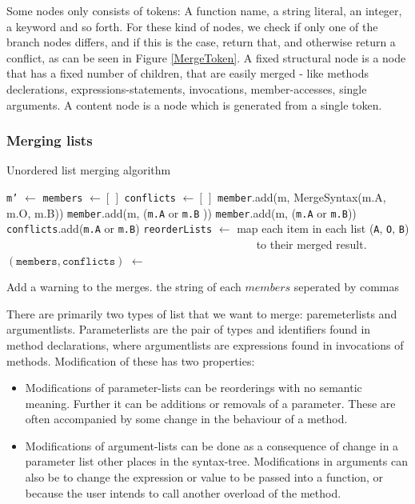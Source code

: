 \documentclass[11pt]{article}
\begin{document}
Some nodes only consists of tokens: A function name, a string literal, an integer, a keyword and so forth. For these kind of nodes, we check if only one of the branch nodes differs, and if this is the case, return that, and otherwise return a conflict, as can be seen in Figure \ref{MergeToken}. A fixed structural node is a node that has a fixed number of children, that are easily merged - like methods declerations, expressions-statements, invocations, member-accesses, single arguments. A content node is a node which is generated from a single token.

\subsubsection{Merging lists}
\begin{algorithm}
  \caption{Unordered list merging algorithm}
  \label{Listmerger}
\begin{algorithmic}
    \State \texttt{m'} $\gets$ 
    \State \texttt{members} $\gets [\,]$
   	\State \texttt{conflicts} $\gets [\,]$
           \State \texttt{member}.add(m, MergeSyntax(m.A, m.O, m.B))
			\State \texttt{member}.add(m, (\texttt{m.A} or \texttt{m.B} ))
			\State \texttt{member}.add(m, (\texttt{m.A} or \texttt{m.B}))
			\State \texttt{conflicts}.add(\texttt{m.A} or \texttt{m.B})
		\EndIf
	\EndFor
	\State \texttt{reorderLists} $\gets$ map each item in each list (\texttt{A}, \texttt{O}, \texttt{B})
	\State ~~~~~~~~~~~~~~~~~~~~~~~~~~~~~~~~~~~~~~~~~~~~ to their merged result.
	\State $(\texttt{members}, \texttt{conflicts})$ $\gets$ 

        \State Add a warning to the merges.
    \EndFor
	\State \Return the string of each $members$ seperated by commas
\EndFunction
\end{algorithmic}
\end{algorithm}


There are primarily two types of list that we want to merge: paremeterlists and argumentlists. Parameterlists are the pair of types and identifiers found in method declarations, where argumentlists are expressions found in invocations of methods. Modification of these has two properties:

\begin{itemize}
   \item Modifications of parameter-lists can be reorderings with no semantic meaning. Further it can be additions or removals of a parameter. These are often accompanied by some change in the behaviour of a method.
   \item Modifications of argument-lists can be done as a consequence of change in a parameter list other places in the syntax-tree. Modifications in arguments can also be to change the expression or value to be passed into a function, or because the user intends to call another overload of the method.
\end{itemize}
\end{document}

